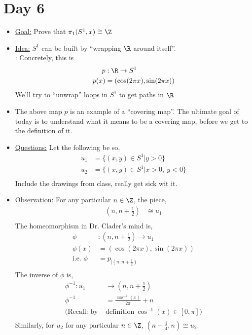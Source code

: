 \section{Day 6}
    \begin{itemize}
        \item \underline{Goal:} Prove that $\pi_{1}(S^1, x)\cong \Z$
        \item \underline{Idea:} $S^1$ can be built by ``wrapping $\R$ around itself''.\\:
            Concretely, this is
            \begin{align*}
                p&: \R \rightarrow S^1\\
                p(x)&=(\cos(2\pi x), \sin(2\pi x))\\
            \end{align*}
            We'll try to ``unwrap'' loops in $S^1$ to get paths in $\R$
        \item
            The above map $p$ is an example of a ``covering map''. The ultimate goal of today is to understand
            what it means to be a covering map, before we get to the definition of it.\\
        \item \underline{Questions:} Let the following be so,
            \begin{align*}
                u_1&=\{(x,y)\in S^1| y>0\}\\
                u_2&=\{(x,y)\in S^1| x>0,\ y<0\}\\
            \end{align*}
            Include the drawings from class, really get sick wit it.
        \item \underline{Observation:} For any particular $n\in \Z$, the piece,
            \begin{align*}
                (n, n+\frac{1}{2})&\cong u_1\\
            \end{align*}
            The homeomorphism in Dr. Clader's mind is,
            \begin{align*}
                \phi&: (n,n+\frac{1}{2})\rightarrow u_1\\
                \phi(x)&=(\cos(2\pi x), \sin(2\pi x))\\
                \text{i.e. } \phi&=p_{|(n,n+\frac{1}{2})}\\
            \end{align*}
            The inverse of $\phi$ is,
            \begin{align*}
                \phi^{-1}: u_1&\rightarrow(n,n+\frac{1}{2})\\
                \phi^{-1}&=\frac{\cos^{-1} (x)}{2\pi}+n\\
                (\text{Recall: by }&\text{definition}\ \cos^{-1}(x)\in[0,\pi])\\
            \end{align*}
            Similarly, for $u_2$ for any particular $n\in \Z$, $(n-\frac{1}{4}, n)\cong u_2$.
    \end{itemize}
